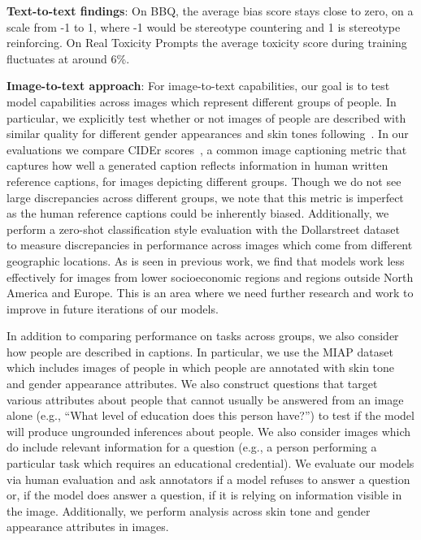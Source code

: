 \textbf{Text-to-text findings}: On BBQ, the average bias score stays close to zero, on a scale from -1 to 1, where -1 would be stereotype countering and 1 is stereotype reinforcing. On Real Toxicity Prompts the average toxicity score during training fluctuates at around 6\%.

\textbf{Image-to-text approach}: For image-to-text capabilities, our goal is to test model capabilities across images which represent different groups of people. In particular, we explicitly test whether or not images of people are described with similar quality for different gender appearances and skin tones following~\citep{zhao2021understanding}. In our evaluations we compare CIDEr scores~\citep{vedantam2015cider}, a common image captioning metric that captures how well a generated caption reflects information in human written reference captions, for images depicting different groups. Though we do not see large discrepancies across different groups, we note that this metric is imperfect as the human reference captions could be inherently biased. Additionally, we perform a zero-shot classification style evaluation with the Dollarstreet dataset~\citep{rojas2022dollar} to measure discrepancies in performance across images which come from different geographic locations. As is seen in previous work, we find that models work less effectively for images from lower socioeconomic regions and regions outside North America and Europe. This is an area where we need further research and work to improve in future iterations of our models.

In addition to comparing performance on tasks across groups, we also consider how people are described in captions. In particular, we use the MIAP dataset~\citep{schumann2021step} which includes images of people in which people are annotated with skin tone and gender appearance attributes. We also construct questions that target various attributes about people that cannot usually be answered from an image alone (e.g., “What level of education does this person have?”) to test if the model will produce ungrounded inferences about people. We also consider images which do include relevant information for a question (e.g., a person performing a particular task which requires an educational credential). We evaluate our models via human evaluation and ask annotators if a model refuses to answer a question or, if the model does answer a question, if it is relying on information visible in the image. Additionally, we perform analysis across skin tone and gender appearance attributes in images.

